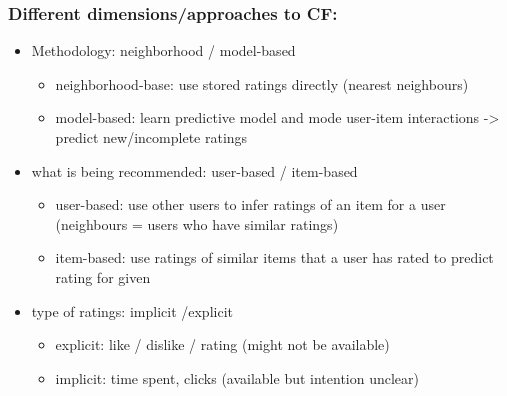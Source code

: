 \subsubsection{Different dimensions/approaches to CF:}
\begin{itemize}
    \item Methodology: neighborhood / model-based
    \begin{itemize}
        \item neighborhood-base: use stored ratings directly (nearest neighbours)
        \item model-based: learn predictive model and mode user-item interactions -> predict new/incomplete ratings
    \end{itemize}
    \item what is being recommended: user-based / item-based
    \begin{itemize}
        \item user-based: use other users to infer ratings of an item for a user (neighbours = users who have similar ratings)
        \item item-based: use ratings of similar items that a user has rated to predict rating for given 
    \end{itemize}
    \item type of ratings: implicit /explicit
    \begin{itemize}
        \item explicit: like / dislike / rating (might not be available)
        \item implicit: time spent, clicks (available but intention unclear)
    \end{itemize}
\end{itemize}
